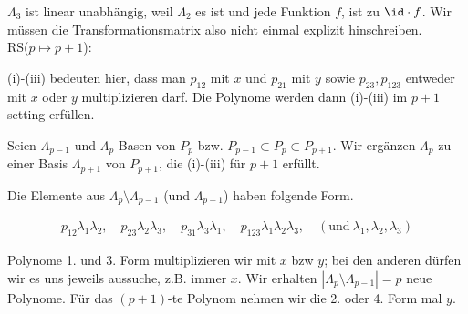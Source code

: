 \begin{solution}
\begin{enumerate}[label = \textbf{\alph*)}]
  $\Lambda_3$ ist linear unabhängig, weil $\Lambda_2$ es ist und jede Funktion $f$, ist zu $\id \cdot f$.
  Wir müssen die Transformationsmatrix also nicht einmal explizit hinschreiben. \\

  RS($p \mapsto p+1$):

  (i)-(iii) bedeuten hier, dass man $p_{12}$ mit $x$ und $p_{21}$ mit $y$ sowie $p_{23}, p_{123}$ entweder mit $x$ oder $y$ multiplizieren darf.
  Die Polynome werden dann (i)-(iii) im $p+1$ setting erfüllen.

  Seien $\Lambda_{p-1}$ und $\Lambda_p$ Basen von $P_p$ bzw. $P_{p-1} \subset P_p \subset P_{p+1}$.
  Wir ergänzen $\Lambda_p$ zu einer Basis $\Lambda_{p+1}$ von $P_{p+1}$, die (i)-(iii) für $p+1$ erfüllt.

  Die Elemente aus $\Lambda_p \setminus \Lambda_{p-1}$ (und $\Lambda_{p-1}$) haben folgende Form.

  \begin{align*}
    p_{12} \lambda_1 \lambda_2,
    \quad
    p_{23} \lambda_2 \lambda_3,
    \quad
    p_{31} \lambda_3 \lambda_1,
    \quad
    p_{123} \lambda_1 \lambda_2 \lambda_3,
    \quad
    (\text{und}~ \lambda_1, \lambda_2, \lambda_3)
  \end{align*}

  Polynome 1. und 3. Form multiplizieren wir mit $x$ bzw $y$;
  bei den anderen dürfen wir es uns jeweils aussuche, z.B. immer $x$.
  Wir erhalten $|\Lambda_p \setminus \Lambda_{p-1}| = p$ neue Polynome.
  Für das $(p+1)$-te Polynom nehmen wir die 2. oder 4. Form mal $y$.
  

\end{enumerate}
\end{solution}
